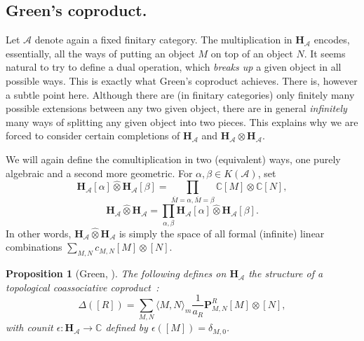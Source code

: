 \documentclass[a4paper,10pt]{amsart}
\def\H{\mathbf{H}}
\def\a{\alpha}
\def\b{\beta}
\def\C{\mathbb{C}}
\def\A{\mathcal{A}}
\newtheorem{prop}[theo]{Proposition}
\numberwithin{equation}{section}
\begin{document}
\vspace{.2in}

\subsection{Green's coproduct.}

\vspace{.15in}

Let $\A$ denote again a fixed finitary category.
The multiplication in $\H_{\A}$ encodes, essentially, all the ways of putting an object $M$ on top of an object $N$. It seems natural to try to define a dual operation, which \textit{breaks up} a given object in all possible ways. This is exactly what Green's coproduct achieves. There is, however a subtle point here. Although there are (in finitary categories) only finitely many possible extensions between any two given object, there are in general \textit{infinitely} many ways of splitting any given object into two pieces. This explains why we are forced to consider certain completions of $\H_{\mathcal{A}}$ and $\H_{\mathcal{A}} \otimes \H_{\mathcal{A}}$.

We will again define the comultiplication in two (equivalent) ways, one purely algebraic and a second more geometric. For $\a,\b \in K(\A)$, set
$$\H_{\A}[\a] \widehat{\otimes} \H_{\A}[\b]=
\prod_{\overline{M}=\a, \overline{M}=\b} \C [M] \otimes \C[N],$$
$$\H_{\A} \widehat{\otimes} \H_{\A}=\prod_{\a,\b} \H_{\A}[\a] \widehat{\otimes} \H_{\A}[\b].$$
In other words, $\H_{\A} \widehat{\otimes} \H_{\A}$ is simply the space of all formal (infinite) linear combinations $\sum_{M,N} c_{M,N} [M] \otimes [N]$.

\vspace{.1in}

\begin{prop}[Green, \cite{Green}]\label{P:coproductHall}  The following defines on $\H_{\mathcal{A}}$ the structure of a topological coassociative coproduct~:
\begin{equation}\label{E:coproductHall1}
\Delta([R])=\sum_{M,N} \langle M,N\rangle_m \frac{1}{a_R} \mathbf{P}^R_{M,N} [M] \otimes [N],
\end{equation} with counit $\epsilon: \H_{\A} \to \C$ defined by $\epsilon([M])=\delta_{M,0}$.
\end{prop}
\end{document}
